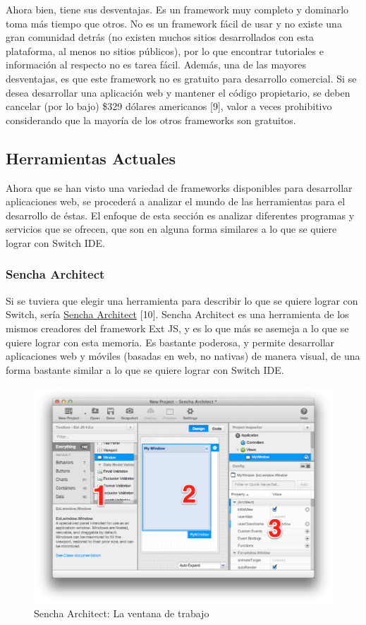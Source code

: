 \documentclass[12pt,titlepage,]{article}
\makeatletter
\def\maxwidth{\ifdim\Gin@nat@width>\linewidth\linewidth
\else\Gin@nat@width\fi}
\let\Oldincludegraphics\includegraphics
\renewcommand{\includegraphics}[1]{\Oldincludegraphics[width=\maxwidth]{#1}}
\makeatother
\begin{document}
Ahora bien, tiene sus desventajas. Es un framework muy completo y
dominarlo toma más tiempo que otros. No es un framework fácil de usar y
no existe una gran comunidad detrás (no existen muchos sitios
desarrollados con esta plataforma, al menos no sitios públicos), por lo
que encontrar tutoriales e información al respecto no es tarea fácil.
Además, una de las mayores desventajas, es que este framework no es
gratuito para desarrollo comercial. Si se desea desarrollar una
aplicación web y mantener el código propietario, se deben cancelar (por
lo bajo) \$329 dólares americanos {[}9{]}, valor a veces prohibitivo
considerando que la mayoría de los otros frameworks son gratuitos.

\subsection{Herramientas Actuales}

Ahora que se han visto una variedad de frameworks disponibles para
desarrollar aplicaciones web, se procederá a analizar el mundo de las
herramientas para el desarrollo de éstas. El enfoque de esta sección es
analizar diferentes programas y servicios que se ofrecen, que son en
alguna forma similares a lo que se quiere lograr con Switch IDE.

\subsubsection{Sencha Architect}

Si se tuviera que elegir una herramienta para describir lo que se quiere
lograr con Switch, sería
\href{http://www.sencha.com/products/architect}{Sencha Architect}
{[}10{]}. Sencha Architect es una herramienta de los mismos creadores
del framework Ext JS, y es lo que más se asemeja a lo que se quiere
lograr con esta memoria. Es bastante poderosa, y permite desarrollar
aplicaciones web y móviles (basadas en web, no nativas) de manera
visual, de una forma bastante similar a lo que se quiere lograr con
Switch IDE.

\begin{figure}[htbp]
\centering
\includegraphics{figures/sencha-architect-big.png}
\caption{Sencha Architect: La ventana de trabajo
\label{figure:sencha-architect}}
\end{figure}
\end{document}

